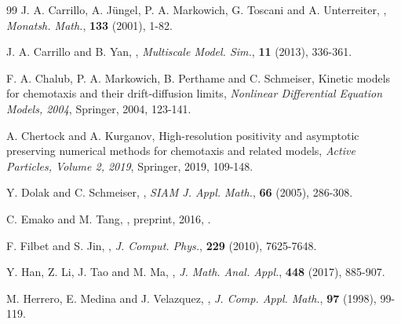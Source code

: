 \documentclass{aims} %
\theoremstyle{definition}
\begin{document}
{\begin{thebibliography}{99}
\newblock J. A. Carrillo, A. J{\"u}ngel, P. A. Markowich, G. Toscani and A. Unterreiter, 
\newblock {},
\newblock \emph{Monatsh. Math.}, \textbf{133} (2001), 1-82.

\newblock J. A. Carrillo and B. Yan, 
\newblock {},
\newblock \emph{Multiscale Model. Sim.}, \textbf{11} (2013), 336-361.

\newblock F. A. Chalub, P. A. Markowich, B. Perthame and C. Schmeiser, 
\newblock Kinetic models for chemotaxis and their drift-diffusion limits,
\newblock \emph{Nonlinear Differential Equation Models, 2004},  Springer, 2004, 123-141.

\newblock A. Chertock and A. Kurganov, 
\newblock High-resolution positivity and asymptotic preserving numerical methods for chemotaxis and related models,
\newblock \emph{Active Particles, Volume 2, 2019},  Springer, 2019, 109-148. 

\newblock Y. Dolak and C. Schmeiser,   
\newblock {},
\newblock \emph{SIAM J. Appl. Math.}, \textbf{66} (2005), 286-308.

\newblock C. Emako and M. Tang,   
\newblock {},
\newblock preprint, 2016, .

\newblock F. Filbet and S. Jin,   
\newblock {},
\newblock \emph{J. Comput. Phys.}, \textbf{229} (2010), 7625-7648.

\newblock Y. Han, Z. Li, J. Tao and M. Ma,    
\newblock {},
\newblock \emph{J. Math. Anal. Appl.}, \textbf{448} (2017), 885-907.

\newblock M. Herrero, E. Medina and J. Velazquez, 
\newblock {},
\newblock \emph{J. Comp. Appl. Math.}, \textbf{97} (1998), 99-119.


\end{thebibliography}}
\end{document}
